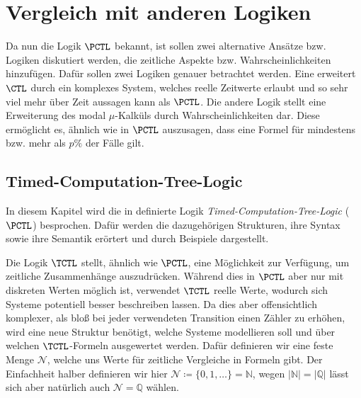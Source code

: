 \section{Vergleich mit anderen Logiken}
\label{ChapVerwandt}

Da nun die Logik $\PCTL$ bekannt, ist sollen zwei alternative Ansätze bzw. Logiken diskutiert werden, die zeitliche Aspekte bzw. Wahrscheinlichkeiten hinzufügen.
Dafür sollen zwei Logiken genauer betrachtet werden.
Eine erweitert $\CTL$ durch ein komplexes System, welches reelle Zeitwerte erlaubt und so sehr viel mehr über Zeit aussagen kann als $\PCTL$.
Die andere Logik stellt eine Erweiterung des modal $\mu$-Kalküls durch Wahrscheinlichkeiten dar.
Diese ermöglicht es, ähnlich wie in $\PCTL$ auszusagen, dass eine Formel für mindestens bzw. mehr als $p\%$ der Fälle gilt.

\subsection{Timed-Computation-Tree-Logic}

In diesem Kapitel wird die in \cite{alur1990model} definierte Logik \textit{Timed-Computation-Tree-Logic} ($\PCTL$) besprochen. Dafür werden die dazugehörigen Strukturen, ihre Syntax sowie ihre Semantik erörtert und durch Beispiele dargestellt.

Die Logik $\TCTL$ stellt, ähnlich wie $\PCTL$, eine Möglichkeit zur Verfügung, um zeitliche Zusammenhänge auszudrücken.
Während dies in $\PCTL$ aber nur mit diskreten Werten möglich ist, verwendet $\TCTL$ reelle Werte, wodurch sich Systeme potentiell besser beschreiben lassen.
Da dies aber offensichtlich komplexer, als bloß bei jeder verwendeten Transition einen Zähler zu erhöhen, wird eine neue Struktur benötigt, welche Systeme modellieren soll und über welchen $\TCTL$-Formeln ausgewertet werden.
Dafür definieren wir eine feste Menge $\mathcal{N}$, welche uns Werte für zeitliche Vergleiche in Formeln gibt.
Der Einfachheit halber definieren wir hier $\mathcal{N}\coloneqq\{0,1,\dots\}=\mathbb{N}$, wegen $\vert\mathbb{N}\vert=\vert\mathbb{Q}\vert$ lässt sich aber natürlich auch $\mathcal{N}=\mathbb{Q}$ wählen. \cite{alur1990model}

